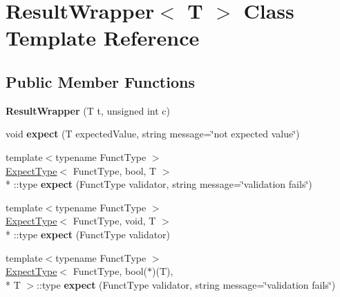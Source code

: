\hypertarget{class_result_wrapper}{\section{Result\-Wrapper$<$ T $>$ Class Template Reference}
\label{class_result_wrapper}
}
\subsection*{Public Member Functions}
\begin{DoxyCompactItemize}
\item 
\hypertarget{class_result_wrapper_a0ec6b572fb84eb686c17de6b72f66e7a}{{\bfseries Result\-Wrapper} (T t, unsigned int c)}\label{class_result_wrapper_a0ec6b572fb84eb686c17de6b72f66e7a}

\item 
\hypertarget{class_result_wrapper_a6315300b6d3c92427368754281708a63}{void {\bfseries expect} (T expected\-Value, string message=\char`\"{}not expected value\char`\"{})}\label{class_result_wrapper_a6315300b6d3c92427368754281708a63}

\item 
\hypertarget{class_result_wrapper_a890ec2d3f0a01375233ac4642bb98ea7}{{\footnotesize template$<$typename Funct\-Type $>$ }\\\hyperlink{struct_expect_type}{Expect\-Type}$<$ Funct\-Type, bool, T $>$\\*
\-::type {\bfseries expect} (Funct\-Type validator, string message=\char`\"{}validation fails\char`\"{})}\label{class_result_wrapper_a890ec2d3f0a01375233ac4642bb98ea7}

\item 
\hypertarget{class_result_wrapper_a9e756a070805e50bc32ea08743870fe6}{{\footnotesize template$<$typename Funct\-Type $>$ }\\\hyperlink{struct_expect_type}{Expect\-Type}$<$ Funct\-Type, void, T $>$\\*
\-::type {\bfseries expect} (Funct\-Type validator)}\label{class_result_wrapper_a9e756a070805e50bc32ea08743870fe6}

\item 
\hypertarget{class_result_wrapper_a2d63ce99e0ff74a6165cba9ce6ffbde6}{{\footnotesize template$<$typename Funct\-Type $>$ }\\\hyperlink{struct_expect_type}{Expect\-Type}$<$ Funct\-Type, bool($\ast$)(T), \\*
T $>$\-::type {\bfseries expect} (Funct\-Type validator, string message=\char`\"{}validation fails\char`\"{})}\label{class_result_wrapper_a2d63ce99e0ff74a6165cba9ce6ffbde6}


\end{DoxyCompactItemize}
